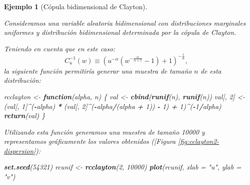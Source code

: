 \documentclass[
  spanish,
  10pt,
]{book}
\newenvironment{Shaded}{\begin{snugshade}}{\end{snugshade}}
\newcommand{\AttributeTok}[1]{\textcolor[rgb]{0.13,0.29,0.53}{#1}}
\newcommand{\ControlFlowTok}[1]{\textcolor[rgb]{0.13,0.29,0.53}{\textbf{#1}}}
\newcommand{\DecValTok}[1]{\textcolor[rgb]{0.00,0.00,0.81}{#1}}
\newcommand{\FunctionTok}[1]{\textcolor[rgb]{0.13,0.29,0.53}{\textbf{#1}}}
\newcommand{\NormalTok}[1]{#1}
\newcommand{\OtherTok}[1]{\textcolor[rgb]{0.56,0.35,0.01}{#1}}
\newcommand{\SpecialCharTok}[1]{\textcolor[rgb]{0.81,0.36,0.00}{\textbf{#1}}}
\newcommand{\StringTok}[1]{\textcolor[rgb]{0.31,0.60,0.02}{#1}}
\theoremstyle{break}
\newtheorem{example}{Ejemplo}[chapter]
\theoremstyle{nonumberplain}
\begin{document}
\begin{example}[Cópula bidimensional de Clayton]
\protect\hypertarget{exm:clayton2d}{}\label{exm:clayton2d}

Consideramos una variable aleatoria bidimensional con distribuciones marginales uniformes y distribución bidimensional determinada por la cópula de Clayton.

Teniendo en cuenta que en este caso:
\[C_{u}^{-1}(w)\equiv\left(  u^{-\alpha}\left(  
w^{-\frac{\alpha}{\alpha+1}}-1\right) + 1 \right)^{-\frac{1}{\alpha}},\]
la siguiente función permitiría generar una muestra de tamaño \(n\) de esta distribución:

\begin{Shaded}
\begin{Highlighting}[]
\NormalTok{rcclayton }\OtherTok{\textless{}{-}} \ControlFlowTok{function}\NormalTok{(alpha, n) \{}
\NormalTok{  val }\OtherTok{\textless{}{-}} \FunctionTok{cbind}\NormalTok{(}\FunctionTok{runif}\NormalTok{(n), }\FunctionTok{runif}\NormalTok{(n))}
\NormalTok{  val[, }\DecValTok{2}\NormalTok{] }\OtherTok{\textless{}{-}}\NormalTok{ (val[, }\DecValTok{1}\NormalTok{]}\SpecialCharTok{\^{}}\NormalTok{(}\SpecialCharTok{{-}}\NormalTok{alpha) }\SpecialCharTok{*} 
\NormalTok{              (val[, }\DecValTok{2}\NormalTok{]}\SpecialCharTok{\^{}}\NormalTok{(}\SpecialCharTok{{-}}\NormalTok{alpha}\SpecialCharTok{/}\NormalTok{(alpha }\SpecialCharTok{+} \DecValTok{1}\NormalTok{)) }\SpecialCharTok{{-}} \DecValTok{1}\NormalTok{) }\SpecialCharTok{+} \DecValTok{1}\NormalTok{)}\SpecialCharTok{\^{}}\NormalTok{(}\SpecialCharTok{{-}}\DecValTok{1}\SpecialCharTok{/}\NormalTok{alpha)}
  \FunctionTok{return}\NormalTok{(val)}
\NormalTok{\}}
\end{Highlighting}
\end{Shaded}

Utilizando esta función generamos una muestra de tamaño 10000 y representamos gráficamente los valores obtenidos ({[}Figura \ref{fig:cclayton2-dispersion}):

\begin{Shaded}
\begin{Highlighting}[]
\FunctionTok{set.seed}\NormalTok{(}\DecValTok{54321}\NormalTok{)}
\NormalTok{rcunif }\OtherTok{\textless{}{-}} \FunctionTok{rcclayton}\NormalTok{(}\DecValTok{2}\NormalTok{, }\DecValTok{10000}\NormalTok{)}
\FunctionTok{plot}\NormalTok{(rcunif, }\AttributeTok{xlab =} \StringTok{"u"}\NormalTok{, }\AttributeTok{ylab =} \StringTok{"v"}\NormalTok{)}
\end{Highlighting}
\end{Shaded}


\end{example}
\end{document}
